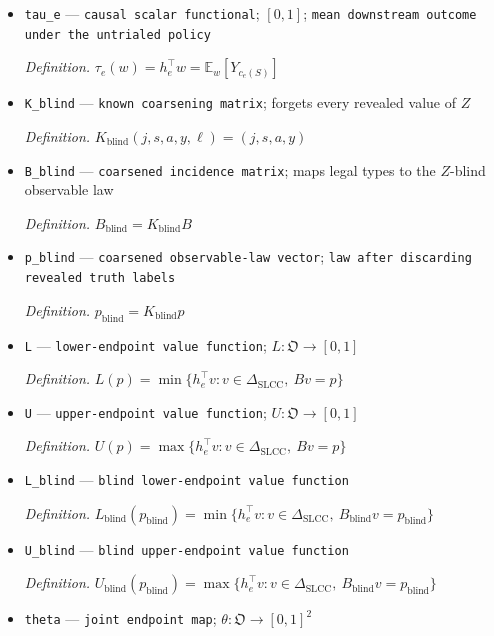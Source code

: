\documentclass{article}
\begin{document}
\begin{itemize}
  \item \texttt{tau\_\allowbreak{}e} --- \texttt{causal scalar functional}; \([0,1]\); \texttt{mean downstream outcome under the untrialed policy}
  \par\smallskip\noindent\emph{Definition.} \(\tau_e(w)=h_e^{\top}w=\mathbb E_w[Y_{c_e(S)}]\)
  \item \texttt{K\_\allowbreak{}blind} --- \texttt{known coarsening matrix}; forgets every revealed value of \(Z\)
  \par\smallskip\noindent\emph{Definition.} \(K_{\mathrm{blind}}(j,s,a,y,\ell)=(j,s,a,y)\)
  \item \texttt{B\_\allowbreak{}blind} --- \texttt{coarsened incidence matrix}; maps legal types to the \(Z\)-blind observable law
  \par\smallskip\noindent\emph{Definition.} \(B_{\mathrm{blind}}=K_{\mathrm{blind}}B\)
  \item \texttt{p\_\allowbreak{}blind} --- \texttt{coarsened observable-\allowbreak{}law vector}; \texttt{law after discarding revealed truth labels}
  \par\smallskip\noindent\emph{Definition.} \(p_{\mathrm{blind}}=K_{\mathrm{blind}}p\)
  \item \texttt{L} --- \texttt{lower-\allowbreak{}endpoint value function}; \(L:\mathfrak O\to[0,1]\)
  \par\smallskip\noindent\emph{Definition.} \(L(p)=\min\{h_e^{\top}v:v\in\Delta_{\mathrm{SLCC}},\ Bv=p\}\)
  \item \texttt{U} --- \texttt{upper-\allowbreak{}endpoint value function}; \(U:\mathfrak O\to[0,1]\)
  \par\smallskip\noindent\emph{Definition.} \(U(p)=\max\{h_e^{\top}v:v\in\Delta_{\mathrm{SLCC}},\ Bv=p\}\)
  \item \texttt{L\_\allowbreak{}blind} --- \texttt{blind lower-\allowbreak{}endpoint value function}
  \par\smallskip\noindent\emph{Definition.} \(L_{\mathrm{blind}}(p_{\mathrm{blind}})=\min\{h_e^{\top}v:v\in\Delta_{\mathrm{SLCC}},\ B_{\mathrm{blind}}v=p_{\mathrm{blind}}\}\)
  \item \texttt{U\_\allowbreak{}blind} --- \texttt{blind upper-\allowbreak{}endpoint value function}
  \par\smallskip\noindent\emph{Definition.} \(U_{\mathrm{blind}}(p_{\mathrm{blind}})=\max\{h_e^{\top}v:v\in\Delta_{\mathrm{SLCC}},\ B_{\mathrm{blind}}v=p_{\mathrm{blind}}\}\)
  \item \texttt{theta} --- \texttt{joint endpoint map}; \(\theta:\mathfrak O\to[0,1]^2\)

\end{itemize}
\end{document}
